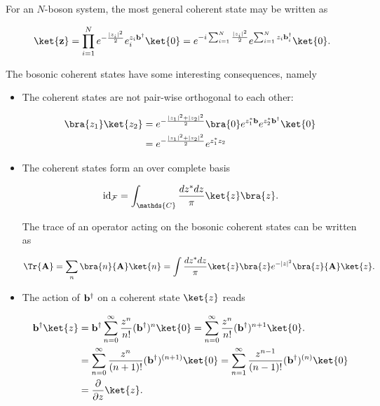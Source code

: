 For an $N$-boson system, the most general coherent state may be written as 

\begin{equation}
    \ket{{\bf z}} = \prod_{i=1}^N e^{-\frac{|z_i|^2}{2}} e^{z_i {\bf b}^\dagger}_i \ket{0} = e^{-i \sum_{i=1}^N \frac{|z_i|^2}{2}} e^{\sum_{i=1}^N z_i {\bf b}_i^\dagger} \ket{0}.
\end{equation}

The bosonic coherent states have some interesting consequences, namely 

\begin{itemize}
    \item The coherent states are not pair-wise orthogonal to each other:
    
    \begin{equation}
        \begin{split}
            \bra{z_1}\ket{z_2} &= e^{-\frac{|z_1|^2+|z_2|^2}{2}} \bra{0} e^{z_1^* {\bf b}} e^{z_2^* {\bf b}^\dagger} \ket{0} \\
            &= e^{-\frac{|z_1|^2+|z_2|^2}{2}} e^{z_1^* z_2}
        \end{split}
    \end{equation}
    
    \item The coherent states form an over complete basis
    
    $$
    \textnormal{id}_{\mathcal{F}} = \int_{\mathds{C}} \frac{dz^* dz}{\pi} \ket{z} \bra{z}.
    $$
    
    The trace of an operator acting on the bosonic coherent states can be written as 
    
    $$
        \Tr {{\bf A}} = \sum_n \bra{n} {{\bf A}} \ket{n} = \int \frac{dz^* dz}{\pi} \ket{z} \bra{z} e^{-|z|^2} \bra{z}{{\bf A}}\ket{z}.
    $$
    
    \item The action of ${\bf b}^\dagger$ on a coherent state $\ket{z}$ reads
    
    \begin{equation}
        \begin{split}
            {\bf b}^\dagger \ket{z} &= {\bf b}^\dagger \sum_{n=0}^{\infty} \frac{z^n}{n!} ({\bf b}^\dagger )^{n} \ket{0} = \sum_{n=0}^{\infty} \frac{z^n}{n!} ({\bf b}^\dagger )^{n+1} \ket{0}. \\
            &= \sum_{n=0}^{\infty} \frac{z^n}{(n+1)!} ({\bf b}^\dagger )^{(n+1)} \ket{0} = \sum_{n=1}^{\infty} \frac{z^{n-1}}{(n-1)!} ({\bf b}^\dagger)^{(n)} \ket{0}\\
            &= \frac{\partial}{\partial z} \ket{z}.
        \end{split}
    \end{equation}
    

\end{itemize}
